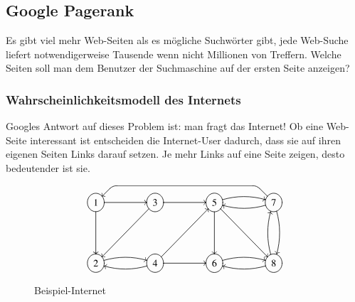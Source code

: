 %
%
%
\subsection{Google Pagerank}
Es gibt viel mehr Web-Seiten als es mögliche Suchwörter gibt, jede Web-Suche
liefert notwendigerweise Tausende wenn nicht Millionen von Treffern.
Welche Seiten soll man dem Benutzer der Suchmaschine auf der ersten Seite 
anzeigen?

\subsubsection{Wahrscheinlichkeitsmodell des Internets}
Googles Antwort auf dieses Problem ist: man fragt das Internet!
Ob eine Web-Seite interessant ist entscheiden die Internet-User dadurch,
dass sie auf ihren eigenen Seiten Links darauf setzen. Je mehr Links auf
eine Seite zeigen, desto bedeutender ist sie.
\begin{figure}
\[\UseTips
\entrymodifiers={++[o][F]}
\xymatrix @=1.5cm {
1 \ar[r] \ar[d]
	& 3 \ar[r] \ar[dl]
		& 5 \ar[d] \ar@/^/[r] \ar[rd]
			& 7 \ar@/^/[d]  \ar@/^/[l]
                                \ar `ul^l[lll]+/u6mm/`l^dl[lll] [lll]
\\
2 \ar@/^/[r]
	& 4 \ar@/^/[l] \ar[r] \ar[ur]
		& 6 \ar@/^/[r]
			& 8 \ar@/^/[l] \ar@/^/[u]
}
\]
\caption{Beispiel-Internet\label{google-sample}}
\end{figure}%

